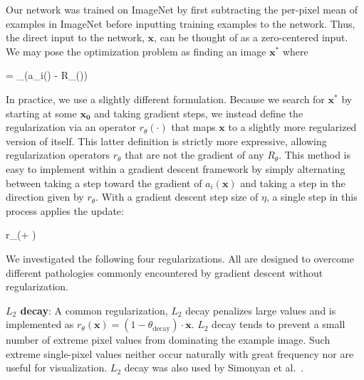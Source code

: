 \documentclass{article}
\DeclareMathOperator*{\argmax}{arg\,max}
\newcommand{\x}{\mathbf{x}}
\newcommand{\xs}{\mathbf{x^*}}
\newcommand{\xn}{\mathbf{x_0}}
\begin{document}
Our network was trained on ImageNet by first subtracting the per-pixel mean of examples in ImageNet before inputting training examples to the network. Thus, the direct input to the network, $\x$, can be thought of as a zero-centered input.  We may pose the optimization problem as finding an image $\xs$ where

\be
\xs = \argmax_\x(a_i(\x) - R_{\theta}(\x))
\ee

In practice, we use a slightly different formulation. Because we search for $\xs$ by starting at some $\xn$ and taking gradient steps, we instead define the regularization via an operator $r_\theta(\cdot)$ that maps $\x$ to a slightly more regularized version of itself. This latter definition is strictly more expressive, allowing regularization operators $r_\theta$ that are not the gradient of any $R_\theta$.
This method is easy to implement within a gradient descent framework by simply alternating between taking a step toward the gradient of $a_i(\x)$ and taking a step in the direction given by $r_\theta$. With a gradient descent step size of $\eta$, a single step in this process applies the update:

\be
\x \leftarrow r_\theta\left(\x + \eta\frac{\partial a_i}{\partial \x}\right) \\
\ee

We investigated the following four regularizations. All are designed to overcome different pathologies commonly encountered by gradient descent without regularization.

{\bf $L_2$ decay}: A common regularization, $L_2$ decay penalizes large values and is implemented as $r_\theta(\x) =(1 - \theta_{\mathrm{decay}})\cdot\x$. $L_2$ decay tends to prevent a small number of extreme pixel values from dominating the example image. Such extreme single-pixel values neither occur naturally with great frequency nor are useful for visualization. $L_2$ decay was also used by Simonyan et al.~.
\end{document}
